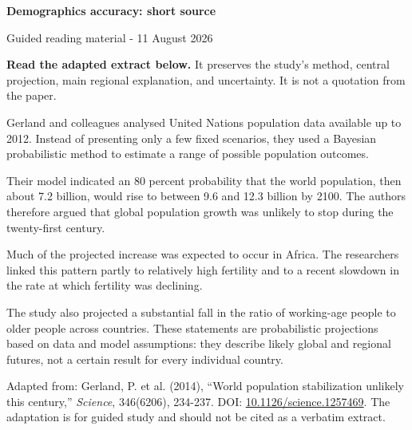\documentclass[11pt,a4paper]{article}
\begin{document}
{\color{ink}\LARGE\bfseries Demographics accuracy: short source}

\vspace{2mm}
{\color{muted}\small Guided reading material - 11 August 2026}

\vspace{7mm}
\textbf{Read the adapted extract below.} It preserves the study's method, central projection, main regional explanation, and uncertainty. It is not a quotation from the paper.

\vspace{4mm}
Gerland and colleagues analysed United Nations population data available up to 2012. Instead of presenting only a few fixed scenarios, they used a Bayesian probabilistic method to estimate a range of possible population outcomes.

Their model indicated an 80 percent probability that the world population, then about 7.2 billion, would rise to between 9.6 and 12.3 billion by 2100. The authors therefore argued that global population growth was unlikely to stop during the twenty-first century.

Much of the projected increase was expected to occur in Africa. The researchers linked this pattern partly to relatively high fertility and to a recent slowdown in the rate at which fertility was declining.

The study also projected a substantial fall in the ratio of working-age people to older people across countries. These statements are probabilistic projections based on data and model assumptions: they describe likely global and regional futures, not a certain result for every individual country.

\vfill
{\color{muted}\small
Adapted from: Gerland, P. et al. (2014), ``World population stabilization unlikely this century,'' \textit{Science}, 346(6206), 234-237. DOI: \href{https://doi.org/10.1126/science.1257469}{10.1126/science.1257469}. The adaptation is for guided study and should not be cited as a verbatim extract.
}
\end{document}
